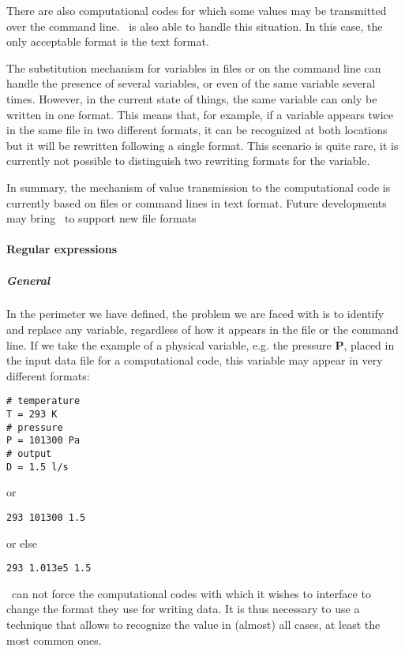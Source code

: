 There are also computational codes for which some values may be transmitted over the command line. \OT\ is also able to handle this situation. In this case, the only acceptable format is the text format.

The substitution mechanism for variables in files or on the command line can handle the presence of several variables, or even of the same variable several times. However, in the current state of things, the same variable can only be written in one format. This means that, for example, if a variable appears twice in the same file in two different formats, it can be recognized at both locations but it will be rewritten following a single format. This scenario is quite rare, it is currently not possible to distinguish two rewriting formats for the variable.

In summary, the mechanism of value transmission to the computational code is currently based on files or command lines in text format. Future developments may bring \OT\ to support new file formats%

\paragraph{Regular expressions}

\subparagraph{General}

In the perimeter we have defined, the problem we are faced with is to identify and replace any variable, regardless of how it appears in the file or the command line. If we take the example of a physical variable, e.g. the pressure {\bf P}, placed in the input data file for a computational code, this variable may appear in very different formats:
\lstset{language=C++, basicstyle=\normalsize}
\begin{lstlisting}[frame=TBRL]
# temperature
T = 293 K
# pressure
P = 101300 Pa
# output
D = 1.5 l/s
\end{lstlisting}

or
\lstset{language=C++, basicstyle=\normalsize}
\begin{lstlisting}[frame=TBRL]
293 101300 1.5
\end{lstlisting}

or else
\lstset{language=C++, basicstyle=\normalsize}
\begin{lstlisting}[frame=TBRL]
293 1.013e5 1.5
\end{lstlisting}

\OT\ can not force the computational codes with which it wishes to interface to change the format they use for writing data. It is thus necessary to use a technique that allows to recognize the value in (almost) all cases, at least the most common ones.


